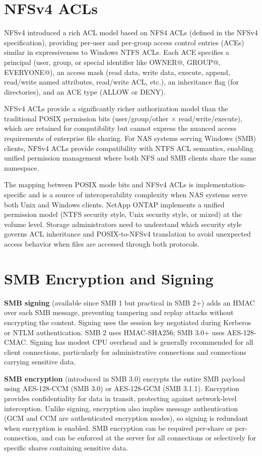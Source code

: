 \section{NFSv4 ACLs}
NFSv4 introduced a rich ACL model based on NFS4 ACLs (defined in the NFSv4 specification), providing per-user and per-group access control entries (ACEs) similar in expressiveness to Windows NTFS ACLs. Each ACE specifies a principal (user, group, or special identifier like OWNER@, GROUP@, EVERYONE@), an access mask (read data, write data, execute, append, read/write named attributes, read/write ACL, etc.), an inheritance flag (for directories), and an ACE type (ALLOW or DENY).

NFSv4 ACLs provide a significantly richer authorization model than the traditional POSIX permission bits (user/group/other $\times$ read/write/execute), which are retained for compatibility but cannot express the nuanced access requirements of enterprise file sharing. For NAS systems serving Windows (SMB) clients, NFSv4 ACLs provide compatibility with NTFS ACL semantics, enabling unified permission management where both NFS and SMB clients share the same namespace.

The mapping between POSIX mode bits and NFSv4 ACLs is implementation-specific and is a source of interoperability complexity when NAS systems serve both Unix and Windows clients. NetApp ONTAP implements a unified permission model (NTFS security style, Unix security style, or mixed) at the volume level. Storage administrators need to understand which security style governs ACL inheritance and POSIX-to-NFSv4 translation to avoid unexpected access behavior when files are accessed through both protocols.

\section{SMB Encryption and Signing}
\textbf{SMB signing} (available since SMB 1 but practical in SMB 2+) adds an HMAC over each SMB message, preventing tampering and replay attacks without encrypting the content. Signing uses the session key negotiated during Kerberos or NTLM authentication. SMB 2 uses HMAC-SHA256; SMB 3.0+ uses AES-128-CMAC. Signing has modest CPU overhead and is generally recommended for all client connections, particularly for administrative connections and connections carrying sensitive data.

\textbf{SMB encryption} (introduced in SMB 3.0) encrypts the entire SMB payload using AES-128-CCM (SMB 3.0) or AES-128-GCM (SMB 3.1.1). Encryption provides confidentiality for data in transit, protecting against network-level interception. Unlike signing, encryption also implies message authentication (GCM and CCM are authenticated encryption modes), so signing is redundant when encryption is enabled. SMB encryption can be required per-share or per-connection, and can be enforced at the server for all connections or selectively for specific shares containing sensitive data.

